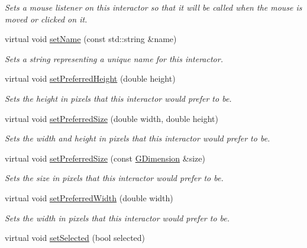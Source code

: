 \begin{DoxyCompactItemize}
\begin{DoxyCompactList}\small\item\em Sets a mouse listener on this interactor so that it will be called when the mouse is moved or clicked on it. \end{DoxyCompactList}\item 
virtual void \mbox{\hyperlink{classsgl_1_1GInteractor_a9d3a2685df23b5e7cbf59c19c4a1f9b5}{set\+Name}} (const std\+::string \&name)
\begin{DoxyCompactList}\small\item\em Sets a string representing a unique name for this interactor. \end{DoxyCompactList}\item 
virtual void \mbox{\hyperlink{classsgl_1_1GInteractor_a1ab987704fce32098706c6f00fb08218}{set\+Preferred\+Height}} (double height)
\begin{DoxyCompactList}\small\item\em Sets the height in pixels that this interactor would prefer to be. \end{DoxyCompactList}\item 
virtual void \mbox{\hyperlink{classsgl_1_1GInteractor_a042c5ae19430d765ef552371cae3632c}{set\+Preferred\+Size}} (double width, double height)
\begin{DoxyCompactList}\small\item\em Sets the width and height in pixels that this interactor would prefer to be. \end{DoxyCompactList}\item 
virtual void \mbox{\hyperlink{classsgl_1_1GInteractor_aa22d9be4bc0e078bb0ea69b0fc9d7c75}{set\+Preferred\+Size}} (const \mbox{\hyperlink{structsgl_1_1GDimension}{G\+Dimension}} \&size)
\begin{DoxyCompactList}\small\item\em Sets the size in pixels that this interactor would prefer to be. \end{DoxyCompactList}\item 
virtual void \mbox{\hyperlink{classsgl_1_1GInteractor_a3db429ab2fa52efd187eec0ed8cdd9f2}{set\+Preferred\+Width}} (double width)
\begin{DoxyCompactList}\small\item\em Sets the width in pixels that this interactor would prefer to be. \end{DoxyCompactList}\item 
virtual void \mbox{\hyperlink{classsgl_1_1GRadioButton_ad42accd39af295a957386c68dac3dcae}{set\+Selected}} (bool selected)

\end{DoxyCompactItemize}
